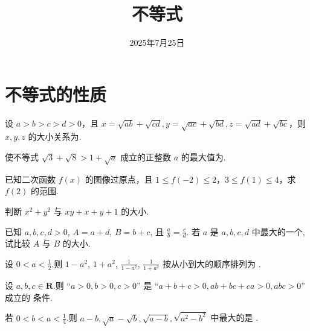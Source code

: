 \documentclass[a4paper , final]{ctexart}
\title{不等式}
\date{2025年7月25日}
\newenvironment{problem}[1]{%
  \item #1
  \par
  \vspace{8cm}
}{}
\begin{document}
\maketitle

\section*{不等式的性质}

\begin{problems}
  \begin{problem}
  {
  设 $a>b>c>d>0$，且 $x=\sqrt{ab}+\sqrt{cd},y=\sqrt{ac}+\sqrt{bd},z=\sqrt{ad}+\sqrt{bc}$，则 $x,y,z$ 的大小关系为\underline{\hspace{3cm}}.
  }
  \end{problem}

  \begin{problem}
  {
  使不等式 $\sqrt{3}+\sqrt{8}>1+\sqrt{a}$ 成立的正整数 $a$ 的最大值为\underline{\hspace{3cm}}.
  }
  \end{problem}

  \begin{problem}
  {
  已知二次函数 $f(x)$ 的图像过原点，且 $1 \le f(-2) \le 2$，$3 \le f(1) \le 4$，求 $f(2)$ 的范围.
  }
  \end{problem}

  \begin{problem}
  {
  判断 $x^2+y^2$ 与 $xy+x+y+1$ 的大小.
  }
  \end{problem}

  \begin{problem}
  {
  已知 $a,b,c,d > 0$, $A = a+d$, $B = b+c$, 且 $\frac{a}{b} = \frac{c}{d}$. 若 $a$ 是 $a,b,c,d$ 中最大的一个, 试比较 $A$ 与 $B$ 的大小.
  }
  \end{problem}

  \begin{problem}
  {
  设 $0 < a < \frac{1}{2}$.则 $1-a^2$, $1+a^2$, $\frac{1}{1-a^2}$, $\frac{1}{1+a^2}$ 按从小到大的顺序排列为 \underline{\hspace{3cm}}.
  }
  \end{problem}

  \begin{problem}
  {
  设 $a,b,c \in \mathbf{R}$.则 “$a>0, b>0, c>0$” 是 “$a+b+c > 0, ab+bc+ca > 0, abc > 0$” 成立的 \underline{\hspace{3cm}} 条件.
  }
  \end{problem}

  \begin{problem}
  {
  若 $0 < b < a < \frac{1}{4}$.则 $a-b, \sqrt{a}-\sqrt{b}, \sqrt{a-b}, \sqrt{a^2-b^2}$ 中最大的是 \underline{\hspace{3cm}}.
  }
  \end{problem}


\end{problems}
\end{document}
